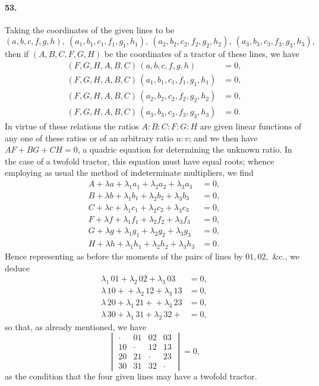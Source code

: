 \documentclass[11pt,a4paper]{article}
\begin{document}
\paragraph{53.}
Taking the coordinates of the given lines to be
\[
(a,b,c,f,g,h),\ (a_1, b_1, c_1, f_1, g_1, h_1),\ (a_2, b_2, c_2, f_2, g_2, h_2),\ (a_3, b_3, c_3, f_3, g_3, h_3),
\]
then if $(A, B, C, F, G, H)$ be the coordinates of a tractor of these lines, we have
\begin{align*}
(F, G, H, A, B, C)\,(a,b,c,f,g,h) &= 0, \\
(F, G, H, A, B, C)\,(a_1, b_1, c_1, f_1, g_1, h_1) &= 0, \\
(F, G, H, A, B, C)\,(a_2, b_2, c_2, f_2, g_2, h_2) &= 0, \\
(F, G, H, A, B, C)\,(a_3, b_3, c_3, f_3, g_3, h_3) &= 0.
\end{align*}
In virtue of these relations the ratios $A : B : C : F : G : H$ are given linear
functions of any one of these ratios or of an arbitrary ratio $u : v$; and we then have
$AF + BG + CH = 0$, a quadric equation for determining the unknown ratio. In the
case of a twofold tractor, this equation must have equal roots; whence employing as
usual the method of indeterminate multipliers, we find
\begin{align*}
A + \lambda a + \lambda_1 a_1 + \lambda_2 a_2 + \lambda_3 a_3 &= 0, \\
B + \lambda b + \lambda_1 b_1 + \lambda_2 b_2 + \lambda_3 b_3 &= 0, \\
C + \lambda c + \lambda_1 c_1 + \lambda_2 c_2 + \lambda_3 c_3 &= 0, \\
F + \lambda f + \lambda_1 f_1 + \lambda_2 f_2 + \lambda_3 f_3 &= 0, \\
G + \lambda g + \lambda_1 g_1 + \lambda_2 g_2 + \lambda_3 g_3 &= 0, \\
H + \lambda h + \lambda_1 h_1 + \lambda_2 h_2 + \lambda_3 h_3 &= 0.
\end{align*}
Hence representing as before the moments of the pairs of lines by $01, 02,$ \&c., we
deduce
\begin{align*}
\lambda_1\,01 + \lambda_2\,02 + \lambda_3\,03 &= 0, \\
\lambda\,10 + {} + \lambda_2\,12 + \lambda_3\,13 &= 0, \\
\lambda\,20 + \lambda_1\,21 + {} + \lambda_3\,23 &= 0, \\
\lambda\,30 + \lambda_1\,31 + \lambda_2\,32 + {} &= 0,
\end{align*}
so that, as already mentioned, we have
\[
\begin{vmatrix}
\cdot & 01 & 02 & 03 \\
10 & \cdot & 12 & 13 \\
20 & 21 & \cdot & 23 \\
30 & 31 & 32 & \cdot
\end{vmatrix} = 0,
\]
as the condition that the four given lines may have a twofold tractor.
\end{document}
